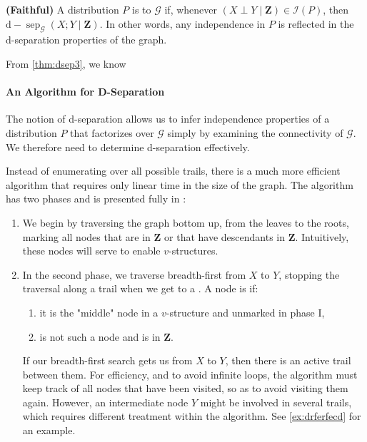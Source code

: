 \documentclass{article}
\newcommand{\bfs}[1]{\textbf{({#1}) }}
\begin{document}
\begin{defa}\bfs{Faithful}
A distribution $P$ is  to $\mathcal{G}$ if, whenever $(X \perp Y \mid \boldsymbol{Z}) \in \mathcal{I}(P)$, then $\mathrm{d}-\operatorname{sep}_{\mathcal{G}}(X ; Y \mid \boldsymbol{Z}) .$ In other words, any independence in $P$ is reflected in the d-separation properties of the graph.
\end{defa}
From \cref{thm:dsep3}, we know 

\paragraph{An Algorithm for D-Separation}
The notion of d-separation allows us to infer independence properties of a distribution $P$ that factorizes over $\mathcal{G}$ simply by examining the connectivity of $\mathcal{G}$. We therefore need to  determine d-separation effectively.

Instead of enumerating over all possible trails, there is a much more efficient algorithm that requires only linear time in the size of the graph. The algorithm has two phases and is presented fully in \cite[algorithm 3.1.]{koller2009probabilistic}:
\begin{enumerate}
    \item We begin by traversing the graph bottom up, from the leaves to the roots, marking all nodes that are in $\boldsymbol{Z}$ or that have descendants in $\boldsymbol{Z}$. Intuitively, these nodes will serve to enable $v$-structures.
    \item In the second phase, we traverse breadth-first from $X$ to $Y$, stopping the traversal along a trail when we get to a . A node is  if: 
    \begin{enumerate}
        \item it is the "middle" node in a $v$-structure and unmarked in phase I,
        \item is not such a node and is in $\boldsymbol{Z}$.
    \end{enumerate}
     If our breadth-first search gets us from $X$ to $Y$, then there is an active trail between them. For efficiency, and to avoid infinite loops, the algorithm must keep track of all nodes that have been visited, so as to avoid visiting them again. However, an intermediate node $Y$ might be involved in several trails, which  requires different treatment within the algorithm. See \cref{ex:drferfecd} for an example.  
\end{enumerate} 
\end{document}
